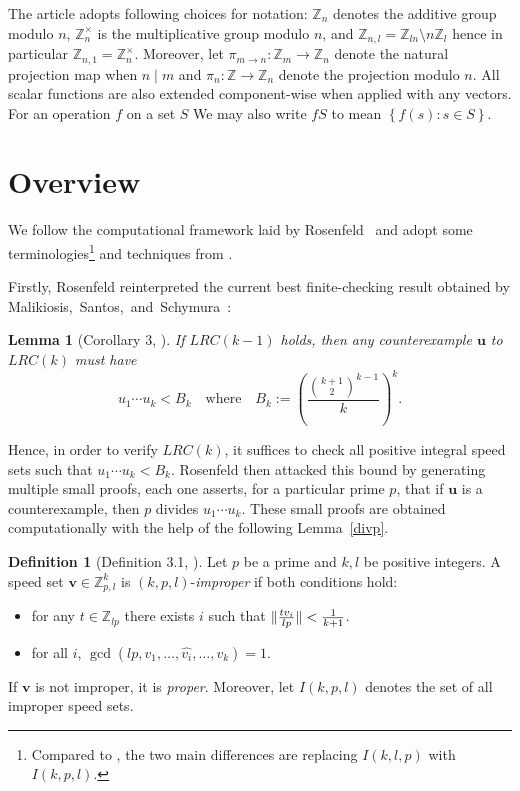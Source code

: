 \documentclass[11pt]{amsart}
\DeclarePairedDelimiter\norm{\lVert}{\rVert}
\newcommand{\set}[1]{\left\{#1\right\}}
\newcommand{\paren}[1]{\left(#1\right)}
\newcommand{\Int}[1]{\mathbb Z_{#1}}
\newcommand{\Unit}[1]{\Int{#1}^\times}
\newcommand{\Z}{\mathbb{Z}}
\newcommand{\vbf}{\mathbf{v}}
\newcommand{\ubf}{\mathbf{u}}
\newtheorem{lemma}[theorem]{Lemma}
\theoremstyle{definition}
\newtheorem{definition}[theorem]{Definition}
\theoremstyle{remark}
\begin{document}
The article adopts following choices for notation: $\Int{n}$ denotes the additive group modulo $n$,
$\Unit{n}$ is the multiplicative group modulo $n$, and $\Int{n,l} = \Int{ln} \setminus n\Int{l}$
hence in particular $\Int{n,1}=\Unit{n}$.
Moreover, let $\pi_{m \to n}:\Int{m} \to \Int{n}$ denote the natural projection map when $n\mid m$
and $\pi_n: \Z \to \Int{n}$ denote the projection modulo $n$.
All scalar functions are also extended component-wise when applied with any vectors. 
For an operation $f$ on a set $S$ We may also write $fS$ to mean $\set{f(s) : s \in S}$. %

\section{Overview}
We follow the computational framework laid by Rosenfeld~\cite{Rosenfeld}
and adopt some terminologies\footnote{
  Compared to \cite{Trakulthongchai}, the two main differences are replacing $I(k,l,p)$ with $I(k,p,l)$.
} and techniques from \cite{Trakulthongchai}.

Firstly, Rosenfeld reinterpreted the current best finite-checking result obtained by Malikiosis,~Santos,~and~Schymura~\cite{Malikiosis}:
\begin{lemma}[Corollary 3, \cite{Rosenfeld}] \label{ublemma}
    If $LRC(k-1)$ holds, then any counterexample $\ubf$ to $LRC(k)$ must have
    \[ u_1\cdots u_k < B_k \quad \text{where} \quad B_k := \paren{\frac{\binom{k+1}{2}^{k-1}}{k}}^k. \]
\end{lemma}

Hence, in order to verify $LRC(k)$, it suffices to check all positive integral speed sets such that $u_1 \cdots u_k < B_k$.
Rosenfeld then attacked this bound by generating multiple small proofs, each one asserts, for a particular prime $p$, 
that if $\ubf$ is a counterexample, then $p$ divides $u_1 \cdots u_k$. 
These small proofs are obtained computationally with the help of the following Lemma~\ref{divp}.

\begin{definition}[Definition 3.1, \cite{Trakulthongchai}] \label{def:improper}
    Let $p$ be a prime and $k,l$ be positive integers.
    A speed set $\vbf\in\Int{p,l}^k$ is $(k,p,l)$-\emph{improper} if both conditions hold: 
  \begin{itemize}
    \item for any $t \in \Int{lp}$ there exists $i$ such that $\norm{\frac{tv_i}{lp}} < \frac{1}{k+1}$.
    \item for all $i$, $\gcd(lp, v_1, \dots, \widehat{v_{i}}, \dots, v_k) = 1$.
  \end{itemize}
   If $\vbf$ is not improper, it is \emph{proper}. Moreover, let $I(k,p,l)$ denotes the set of all improper speed sets.
\end{definition}
\end{document}
